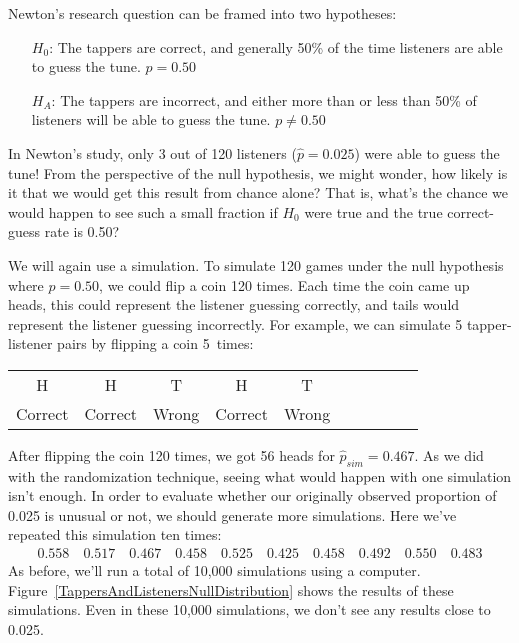 Newton's research question can be framed into two hypotheses:
\begin{itemize}
\setlength{\itemsep}{0mm}
\item[$H_0$:] The tappers are correct, and generally 50\% of the time listeners are able to guess the tune. $p = 0.50$
\item[$H_A$:] The tappers are incorrect, and either more than or less than 50\% of listeners will be able to guess the tune. $p \neq 0.50$
\end{itemize}

In Newton's study, only 3 out of 120 listeners ($\hat{p} = 0.025$) were able to guess the tune! From the perspective of the null hypothesis, we might wonder, how likely is it that we would get this result from chance alone? That is, what's the chance we would happen to see such a small fraction if $H_0$ were true and the true correct-guess rate is 0.50?

We will again use a simulation. To simulate 120 games under the null hypothesis where $p = 0.50$, we could flip a coin 120 times. Each time the coin came up heads, this could represent the listener guessing correctly, and tails would represent the listener guessing incorrectly. For example, we can simulate 5 tapper-listener pairs by flipping a coin 5~times:
\begin{center}
\begin{tabular}{ccc ccc ccc c}
H & H & T & H & T \\
Correct & Correct & Wrong & Correct & Wrong \\
\end{tabular}
\end{center}
After flipping the coin 120 times, we got 56 heads for $\hat{p}_{sim} = 0.467$. As we did with the randomization technique, seeing what would happen with one simulation isn't enough. In order to evaluate whether our originally observed proportion of 0.025 is unusual or not, we should generate more simulations. Here we've repeated this simulation ten times:
\begin{align*}
0.558 \quad 0.517 \quad 0.467 \quad 0.458 \quad
0.525 \quad 0.425 \quad 0.458 \quad 0.492 \quad
0.550 \quad 0.483
\end{align*} %
As before, we'll run a total of 10,000 simulations using a computer. Figure~\ref{TappersAndListenersNullDistribution} shows the results of these simulations. Even in these 10,000 simulations, we don't see any results close to 0.025.

